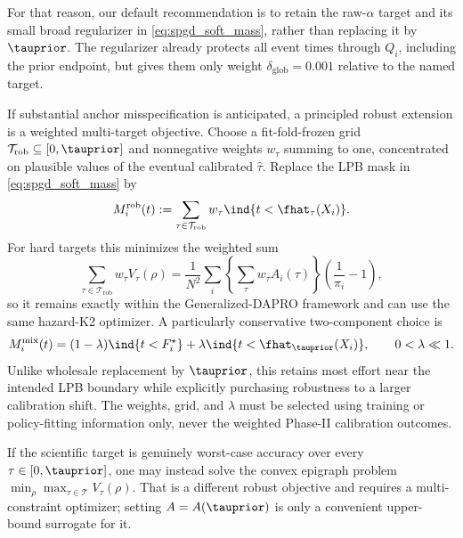 For that reason, our default recommendation is to retain the raw-$\alpha$
target and its small broad regularizer in \eqref{eq:spgd_soft_mass}, rather
than replacing it by $\tauprior$.  The regularizer already protects all event
times through $Q_i$, including the prior endpoint, but gives them only weight
$\delta_{\mathrm{glob}}=0.001$ relative to the named target.

If substantial anchor misspecification is anticipated, a principled robust
extension is a weighted multi-target objective.  Choose a fit-fold-frozen grid
$\mathcal T_{\mathrm{rob}}\subseteq[0,\tauprior]$ and nonnegative weights
$w_\tau$ summing to one, concentrated on plausible values of the eventual
calibrated $\widehat\tau$.  Replace the LPB mask in
\eqref{eq:spgd_soft_mass} by
\begin{equation}
    M_i^{\mathrm{rob}}(t)
    :=\sum_{\tau\in\mathcal T_{\mathrm{rob}}}
       w_\tau\ind{t<\fhat_\tau(X_i)}.
    \label{eq:spgd_robust_mask}
\end{equation}
For hard targets this minimizes the weighted sum
\begin{equation}
    \sum_{\tau\in\mathcal T_{\mathrm{rob}}}w_\tau V_\tau(\rho)
    =\frac{1}{N^2}\sum_i
       \left\{\sum_\tau w_\tau A_i(\tau)\right\}
       \left(\frac{1}{\pi_i}-1\right),
    \label{eq:spgd_weighted_variances}
\end{equation}
so it remains exactly within the Generalized-DAPRO framework and can use the
same hazard-K2 optimizer.  A particularly conservative two-component choice
is
\begin{equation}
    M_i^{\mathrm{mix}}(t)
      =(1-\lambda)\ind{t<F_i^\star}
       +\lambda\ind{t<\fhat_{\tauprior}(X_i)},
    \qquad 0<\lambda\ll1.
    \label{eq:spgd_alpha_prior_mixture}
\end{equation}
Unlike wholesale replacement by $\tauprior$, this retains most effort near
the intended LPB boundary while explicitly purchasing robustness to a larger
calibration shift.  The weights, grid, and $\lambda$ must be selected using
training or policy-fitting information only, never the weighted Phase-II
calibration outcomes.

If the scientific target is genuinely worst-case accuracy over every
$\tau\in[0,\tauprior]$, one may instead solve the convex epigraph problem
$\min_\rho\max_{\tau\in\mathcal T}V_\tau(\rho)$.  That is a different robust
objective and requires a multi-constraint optimizer; setting
$A=A(\tauprior)$ is only a convenient upper-bound surrogate for it.


